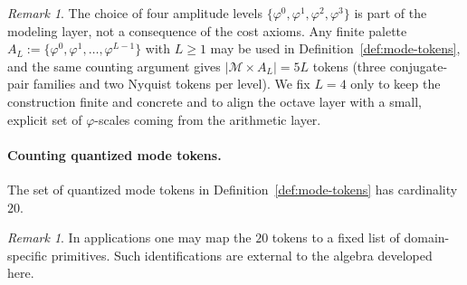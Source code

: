 \documentclass[11pt,reqno]{amsart}
\theoremstyle{plain}
\theoremstyle{definition}
\theoremstyle{remark}
\newtheorem{remark}[theorem]{Remark} %
\newcommand{\phig}{\varphi}
\newcommand{\1}{\mathbf{1}}
\begin{document}
\begin{remark}\label{rem:four-levels}
The choice of four amplitude levels $\{\phig^0,\phig^1,\phig^2,\phig^3\}$ is part of the modeling layer, not a consequence of the cost axioms.
Any finite palette $A_L:=\{\phig^0,\phig^1,\dots,\phig^{L-1}\}$ with $L\ge1$ may be used in Definition~\ref{def:mode-tokens}, and the same counting argument gives
$|\mathcal M\times A_L|=5L$ tokens (three conjugate-pair families and two Nyquist tokens per level).
We fix $L=4$ only to keep the construction finite and concrete and to align the octave layer with a small, explicit set of $\phig$-scales coming from the arithmetic layer.
\end{remark}

\paragraph{Counting quantized mode tokens.}\label{prop:20modes}
The set of quantized mode tokens in Definition~\ref{def:mode-tokens} has
cardinality $20$.

\begin{remark}
In applications one may map the $20$ tokens to a fixed list of domain-specific primitives.
Such identifications are external to the algebra developed here.
\end{remark} %





\end{document}
